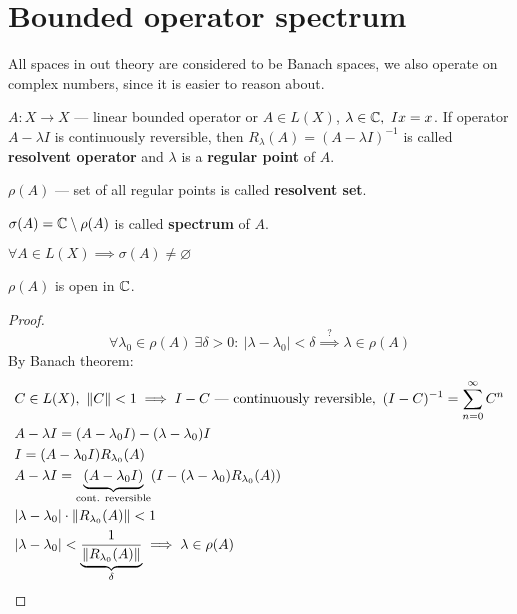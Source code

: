 \section{Bounded operator spectrum}
\noindent
All spaces in out theory are considered to be Banach spaces, we also operate on
complex numbers, since it is easier to reason about.

\begin{defn}
  $A\colon X \to X$ --- linear bounded operator or $A \in L(X)$,
  $\lambda \in \mathbb{C},\ Ix = x$.
  If operator $A - \lambda I$ is continuously reversible, then
  $R_\lambda(A) = (A - \lambda I)^{-1}$ is called \textbf{resolvent operator} and
  $\lambda$ is a \textbf{regular point} of $A$. 
\end{defn}

\begin{defn}
  $\rho(A)$ --- set of all regular
  points is called \textbf{resolvent set}. 
\end{defn}

\begin{defn}
  $\sigma(A) = \mathbb{C} \setminus \rho(A)$ is called \textbf{spectrum}
  of $A$.
\end{defn}

\begin{thm}\label{thm:main}
  $\forall A \in L(X) \implies \sigma(A) \neq \varnothing$
\end{thm}

\begin{thm}
  $\rho(A)$ is open in $\mathbb{C}$.
\end{thm}

\begin{proof}
  \[
    \forall \lambda_0 \in \rho(A)\ \exists \delta > 0:\ |\lambda - \lambda_0| <
    \delta \overset{?}{\implies} \lambda \in \rho(A)
  \]
  By Banach theorem:
  \begin{align*}
    &C \in L(X),\ \|C\| < 1 \implies I - C \text{ --- continuously reversible},\ (I -
      C)^{-1} = \sum_{n = 0}^\infty C^n\\
    &A - \lambda I = (A - \lambda_0 I) - (\lambda - \lambda_0) I \\
    &I = (A - \lambda_0 I)R_{\lambda_0}(A)\\
    &A -\lambda I = \underbrace{(A - \lambda_0 I)}_{\text{cont. reversible}}(I - (\lambda - \lambda_0)R_{\lambda_0}(A)) \\
    &|\lambda - \lambda_0| \cdot \|R_{\lambda_0}(A)\| < 1\\
    &|\lambda - \lambda_0| < \underbrace{\frac{1}{\|R_{\lambda_0}(A)\|}}_\delta \implies \lambda \in \rho(A) \qedhere
  \end{align*}
\end{proof}

